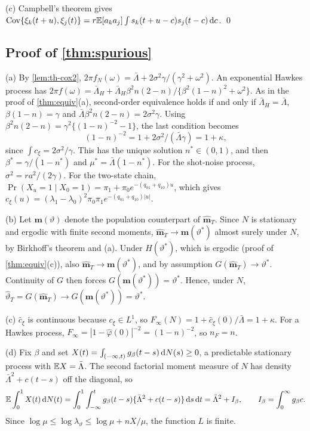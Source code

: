 (c) Campbell's theorem gives
$\operatorname{Cov}\{\xi_k(t+u),\xi_j(t)\}=r\mathbb{E}[a_ka_j]\int s_k(t+u-c)s_j(t-c)\,\mathrm{d} c$. \qed

\subsection{Proof of \texorpdfstring{\cref{thm:spurious}}{Theorem (spurious contagion)}}

(a) By \cref{lem:th-cox2}, $2\pi f_N(\omega)=\bar\Lambda+2\sigma^2\gamma/(\gamma^2+\omega^2)$.
An exponential Hawkes process has
$2\pi f(\omega)=\bar\Lambda_H+\bar\Lambda_H\beta^2n(2-n)/\{\beta^2(1-n)^2+\omega^2\}$.
As in the proof of \cref{thm:equiv}(a), second-order equivalence holds if and only if
$\bar\Lambda_H=\bar\Lambda$, $\beta(1-n)=\gamma$ and
$\bar\Lambda\beta^2n(2-n)=2\sigma^2\gamma$. Using
$\beta^2n(2-n)=\gamma^2\{(1-n)^{-2}-1\}$, the last condition becomes
\[
(1-n)^{-2}=1+2\sigma^2/(\bar\Lambda\gamma)=1+\kappa ,
\]
since $\int c_\xi=2\sigma^2/\gamma$. This has the unique solution $n^*\in(0,1)$, and
then $\beta^*=\gamma/(1-n^*)$ and $\mu^*=\bar\Lambda(1-n^*)$. For the shot-noise process,
$\sigma^2=r a^2/(2\gamma)$. For the two-state chain,
$\Pr(X_u=1\mid X_0=1)=\pi_1+\pi_0e^{-(q_{01}+q_{10})u}$, which gives
$c_\xi(u)=(\lambda_1-\lambda_0)^2\pi_0\pi_1e^{-(q_{01}+q_{10})|u|}$.

(b) Let $\bm m(\vartheta)$ denote the population counterpart of $\hat{\bm m}_T$. Since $N$
is stationary and ergodic with finite second moments, $\hat{\bm m}_T\to\bm m(\vartheta^*)$
almost surely under $N$, by Birkhoff's theorem and (a). Under $H(\vartheta^*)$, which is
ergodic (proof of \cref{thm:equiv}(c)), also $\hat{\bm m}_T\to\bm m(\vartheta^*)$, and by
assumption $G(\hat{\bm m}_T)\to\vartheta^*$. Continuity of $G$ then forces
$G(\bm m(\vartheta^*))=\vartheta^*$. Hence, under $N$,
$\hat\vartheta_T=G(\hat{\bm m}_T)\to G(\bm m(\vartheta^*))=\vartheta^*$.

(c) $\hat c_\xi$ is continuous because $c_\xi\in L^1$, so
$F_\infty(N)=1+\hat c_\xi(0)/\bar\Lambda=1+\kappa$. For a Hawkes process,
$F_\infty=|1-\hat\varphi(0)|^{-2}=(1-n)^{-2}$, so $n_F=n$.

(d) Fix $\beta$ and set $X(t)=\int_{(-\infty,t)}g_\beta(t-s)\,\mathrm{d}N(s)\ge0$, a predictable
stationary process with $\mathbb{E} X=\bar\Lambda$. The second factorial moment measure of $N$
has density $\bar\Lambda^2+c(t-s)$ off the diagonal, so
\begin{equation}\label{eq:th-EXdN}
\mathbb{E}\int_0^1X(t)\,\mathrm{d}N(t)=\int_0^1\int_{-\infty}^{t}g_\beta(t-s)\{\bar\Lambda^2+c(t-s)\}\,\mathrm{d} s\,\mathrm{d} t
=\bar\Lambda^2+I_\beta,
\qquad I_\beta=\int_0^\infty g_\beta c .
\end{equation}
Since $\log\mu\le\log\lambda_\vartheta\le\log\mu+nX/\mu$, the function $L$ is finite.

